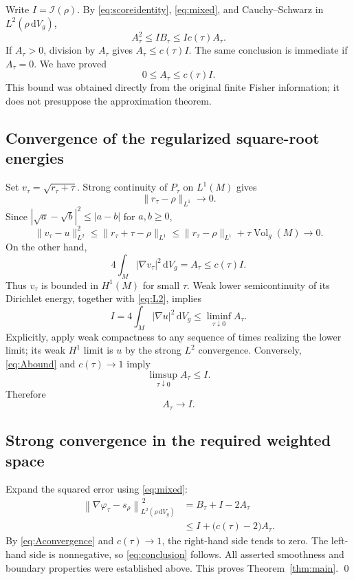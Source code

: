 \documentclass[11pt]{article}
\newcommand{\dd}{\,\mathrm{d}}
\newcommand{\dV}{\dd V_g}
\newcommand{\I}{\mathcal I}
\newcommand{\normrho}[1]{\left\lVert #1\right\rVert_{L^2(\rho\,\mathrm{d}V_g)}}
\begin{document}
Write $I=\I(\rho)$. By \eqref{eq:scoreidentity}, \eqref{eq:mixed}, and Cauchy--Schwarz in $L^2(\rho\,\mathrm{d}V_g)$,
\[
 A_\tau^2\leq I B_\tau\leq I c(\tau)A_\tau.
\]
If $A_\tau>0$, division by $A_\tau$ gives $A_\tau\leq c(\tau)I$. The same conclusion is immediate if $A_\tau=0$. We have proved
\begin{equation}\label{eq:Abound}
 0\leq A_\tau\leq c(\tau)I.
\end{equation}
This bound was obtained directly from the original finite Fisher information; it does not presuppose the approximation theorem.

\subsection{Convergence of the regularized square-root energies}
Set $v_\tau=\sqrt{r_\tau+\tau}$. Strong continuity of $P_\tau$ on $L^1(M)$ gives
\[
 \|r_\tau-\rho\|_{L^1}\longrightarrow0.
\]
Since $|\sqrt a-\sqrt b|^2\leq|a-b|$ for $a,b\geq0$,
\begin{equation}\label{eq:L2}
 \|v_\tau-u\|_{L^2}^2
 \leq\|r_\tau+\tau-\rho\|_{L^1}
 \leq\|r_\tau-\rho\|_{L^1}+\tau\operatorname{Vol}_g(M)
 \longrightarrow0.
\end{equation}
On the other hand,
\begin{equation}\label{eq:energy}
 4\int_M|\nabla v_\tau|^2\dV=A_\tau\leq c(\tau)I.
\end{equation}
Thus $v_\tau$ is bounded in $H^1(M)$ for small $\tau$. Weak lower semicontinuity of its Dirichlet energy, together with \eqref{eq:L2}, implies
\[
 I=4\int_M|\nabla u|^2\dV\leq\liminf_{\tau\downarrow0}A_\tau.
\]
Explicitly, apply weak compactness to any sequence of times realizing the lower limit; its weak $H^1$ limit is $u$ by the strong $L^2$ convergence. Conversely, \eqref{eq:Abound} and $c(\tau)\to1$ imply
\[
 \limsup_{\tau\downarrow0}A_\tau\leq I.
\]
Therefore
\begin{equation}\label{eq:Aconvergence}
 A_\tau\longrightarrow I.
\end{equation}

\subsection{Strong convergence in the required weighted space}
Expand the squared error using \eqref{eq:mixed}:
\begin{align*}
 \normrho{\nabla\varphi_\tau-s_\rho}^{\,2}
 &=B_\tau+I-2A_\tau\\
 &\leq I+\big(c(\tau)-2\big)A_\tau.
\end{align*}
By \eqref{eq:Aconvergence} and $c(\tau)\to1$, the right-hand side tends to zero. The left-hand side is nonnegative, so \eqref{eq:conclusion} follows. All asserted smoothness and boundary properties were established above. This proves Theorem~\ref{thm:main}. \qed
\end{document}
